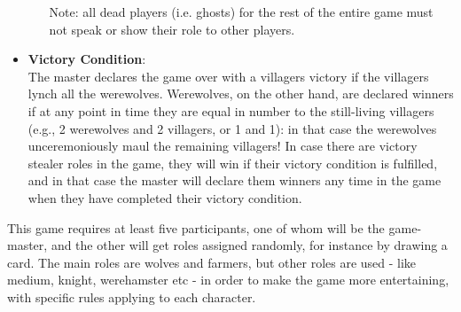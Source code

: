 \begin{itemize}
\begin{itemize}
        Note: all dead players (i.e. ghosts) for the rest of the entire game must not speak or show their role to other players.\\
    \end{itemize}
    \item \textbf{Victory Condition}: \\The master declares the game over with a villagers victory if the villagers lynch all the werewolves. Werewolves, on the other hand, are declared winners if at any point in time they are equal in number to the still-living villagers (e.g., 2 werewolves and 2 villagers, or 1 and 1): in that case the werewolves unceremoniously maul the remaining villagers! In case there are victory stealer roles in the game, they will win if their victory condition is fulfilled, and in that case the master will declare them winners any time in the game when they have completed their victory condition.
\end{itemize}


This game requires at least five participants, one of whom will be the game-master, and the other  will get roles assigned randomly, for instance by drawing a card. The main roles are wolves and farmers, but other roles are used - like medium, knight, werehamster etc - in order to make the game more entertaining, with specific rules applying to each character.\\


